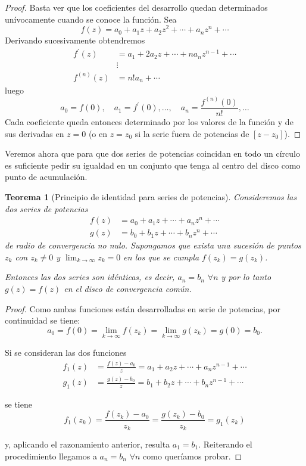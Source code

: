 \documentclass[10pt]{article}
\theoremstyle{plain}
\newtheorem{theorem}{Teorema}[section]
\theoremstyle{definition}
\theoremstyle{remark}
\begin{document}
\begin{proof}
Basta ver que los coeficientes del desarrollo quedan determinados unívocamente cuando se conoce la función. Sea
$$f(z)=a_{0}+a_{1} z+a_{2} z^{2}+\cdots+a_{n} z^{n}+\cdots$$
Derivando sucesivamente obtendremos
$$\begin{aligned}
f^{\prime}(z) &= a_{1}+2 a_{2} z+\cdots+n a_{n} z^{n-1}+\cdots \\
&\vdots \\
f^{(n)}(z) &= n!a_{n}+\cdots
\end{aligned}$$
luego
$$a_{0}=f(0), \quad a_{1}=f^{\prime}(0), \ldots, \quad a_{n}=\frac{f^{(n)}(0)}{n!}, \ldots$$
Cada coeficiente queda entonces determinado por los valores de la función y de sus derivadas en $z=0$ (o en $z=z_{0}$ si la serie fuera de potencias de $[z-z_{0}]$).
\end{proof}

Veremos ahora que para que dos series de potencias coincidan en todo un círculo es suficiente pedir su igualdad en un conjunto que tenga al centro del disco como punto de acumulación.

\begin{theorem}[Principio de identidad para series de potencias]
Consideremos las dos series de potencias
$$\begin{aligned}
f(z) &= a_{0}+a_{1} z+\cdots+a_{n} z^{n}+\cdots \\
g(z) &= b_{0}+b_{1} z+\cdots+b_{n} z^{n}+\cdots
\end{aligned}$$
de radio de convergencia no nulo. Supongamos que exista una sucesión de puntos $z_k$ con $z_k \neq 0$ y $\lim_{k \rightarrow \infty} z_k=0$ en los que se cumpla $f(z_k)=g(z_k)$.

Entonces las dos series son idénticas, es decir, $a_n=b_n$ $\forall n$ y por lo tanto $g(z)=f(z)$ en el disco de convergencia común.
\end{theorem}

\begin{proof}
Como ambas funciones están desarrolladas en serie de potencias, por continuidad se tiene:
$$a_{0}=f(0)=\lim_{k \rightarrow \infty} f(z_{k})=\lim_{k \rightarrow \infty} g(z_{k})=g(0)=b_{0}.$$

Si se consideran las dos funciones
$$\begin{aligned}
f_{1}(z) &= \frac{f(z)-a_{0}}{z}=a_{1}+a_{2} z+\cdots+a_{n} z^{n-1}+\cdots \\
g_{1}(z) &= \frac{g(z)-b_{0}}{z}=b_{1}+b_{2} z+\cdots+b_{n} z^{n-1}+\cdots
\end{aligned}$$

se tiene
$$f_{1}(z_{k})=\frac{f(z_{k})-a_{0}}{z_{k}}=\frac{g(z_{k})-b_{0}}{z_{k}}=g_{1}(z_{k})$$

y, aplicando el razonamiento anterior, resulta $a_{1}=b_{1}$. Reiterando el procedimiento llegamos a $a_{n}=b_{n}$ $\forall n$ como queríamos probar.
\end{proof}
\end{document}
